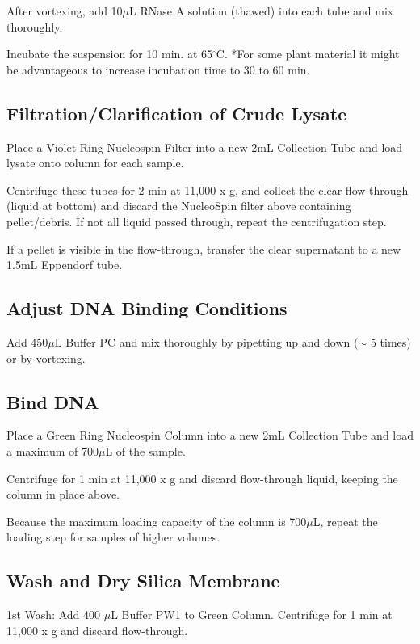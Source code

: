 \documentclass[12pt]{../SOP3_beta}\usepackage[]{graphicx}\usepackage[]{xcolor}
\begin{document}
\NP After vortexing, add 10$\mu$L RNase A solution (thawed) into each tube and mix thoroughly.

\NP Incubate the suspension for 10 min. at 65$^\circ$C. *For some plant material it might be advantageous to increase incubation time to 30 to 60 min. 

\subsection*{Filtration/Clarification of Crude Lysate}

\NP Place a Violet Ring Nucleospin Filter into a new 2mL Collection Tube and load lysate onto column for each sample. 

\NP Centrifuge these tubes for 2 min at 11,000 x g, and collect the clear flow-through (liquid at bottom) and discard the NucleoSpin filter above containing pellet/debris. If not all liquid passed through, repeat the centrifugation step.

\NP If a pellet is visible in the flow-through, transfer the clear supernatant to a new 1.5mL Eppendorf tube. 


\subsection*{Adjust DNA Binding Conditions}

\NP Add 450$\mu$L Buffer PC and mix thoroughly by pipetting up and down ($\sim$ 5 times) or by vortexing.


\subsection*{Bind DNA}

\NP Place a Green Ring Nucleospin Column into a new 2mL Collection Tube and load a maximum of 700$\mu$L of the sample.

\NP Centrifuge for 1 min at 11,000 x g and discard flow-through liquid, keeping the column in place above. 

\NP Because the maximum loading capacity of the column is 700$\mu$L, repeat the loading step for samples of higher volumes.

\subsection*{Wash and Dry Silica Membrane}

\NP 1st Wash: Add 400 $\mu$L Buffer PW1 to Green Column. Centrifuge for 1 min at 11,000 x g and discard flow-through.
\end{document}
